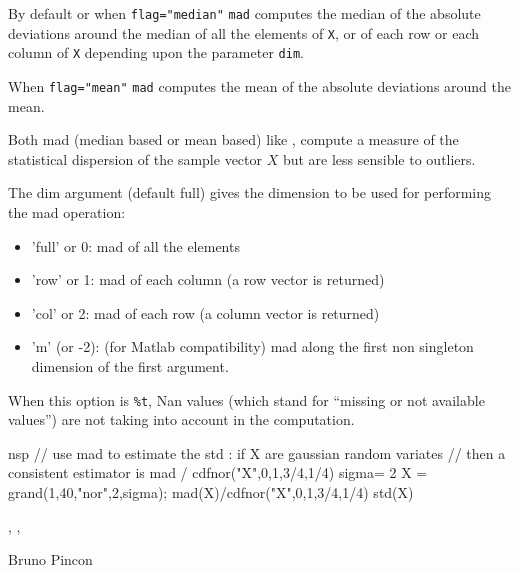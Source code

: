 \begin{mandescription}
 By default or when \verb+flag="median"+ \verb+mad+ computes the median of the absolute deviations
around the median of all the elements of \verb+X+, or of each row or each column of \verb+X+ depending upon
the parameter \verb+dim+.

 When \verb+flag="mean"+  \verb+mad+ computes the mean of the absolute deviations around the
mean.

 Both mad (median based or mean based) like , compute a measure 
of the statistical dispersion of the sample vector $X$ but are less sensible to 
outliers. 


  The dim argument (default full) gives the dimension to be used for performing the mad operation:
  \begin{itemize}
    \item 'full' or 0: mad of all the elements 
    \item 'row' or 1: mad of each column (a row vector is returned)
    \item 'col' or 2: mad of each row (a column vector is returned)
    \item 'm' (or -2): (for Matlab compatibility) mad along the first non 
          singleton dimension of the first argument.
  \end{itemize}

   When this option is \verb+%t+,  Nan values (which stand for ``missing or not 
 available values'') are not taking into account in the computation.
\end{mandescription}
\begin{examples}
\begin{mintednsp}{nsp}
// use mad to estimate the std : if X are gaussian random variates
// then a consistent estimator is mad / cdfnor("X",0,1,3/4,1/4)
sigma= 2 
X = grand(1,40,"nor",2,sigma);
mad(X)/cdfnor("X",0,1,3/4,1/4)
std(X)
\end{mintednsp}
\end{examples}

\begin{manseealso}
   , , 
\end{manseealso}

\begin{authors}
 Bruno Pincon
\end{authors}
